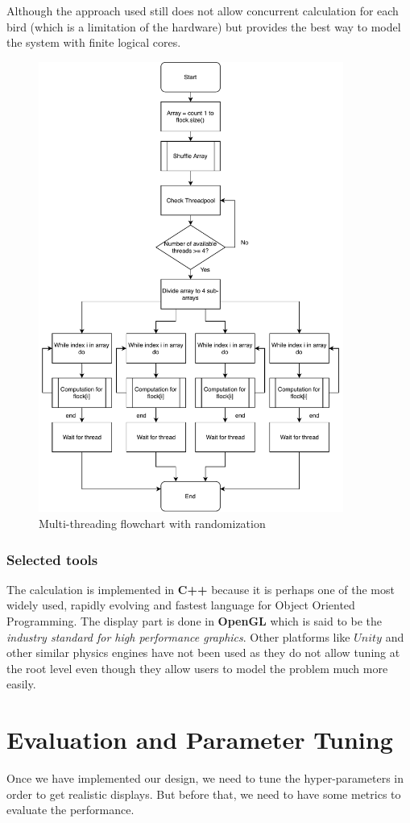 \documentclass{article}
\begin{document}
Although the approach used still does not allow concurrent calculation for each bird (which is a limitation of the hardware) but provides the best way to model the system with finite logical cores.
\begin{figure}[H]
\centering
\includegraphics[width=10cm]{Flock_threading}
\caption{Multi-threading flowchart with randomization}
\end{figure}


\subsubsection{Selected tools}
The calculation is implemented in \textbf{C++} because it is perhaps one of the most widely used, rapidly evolving and fastest language for Object Oriented Programming. The display part is done in \textbf{OpenGL} which is said to be the \textit{industry standard for high performance graphics}. Other platforms like $Unity$ and other similar physics engines have not been used as they do not allow tuning at the root level even though they allow users to model the problem much more easily.
\section{Evaluation and Parameter Tuning}
Once we have implemented our design, we need to tune the hyper-parameters in order to get realistic displays. But before that, we need to have some metrics to evaluate the performance.
\end{document}
